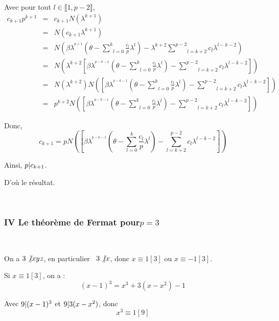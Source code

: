 Avec pour tout $l \in \llbracket 1, p - 2 \rrbracket$,
\begin{eqnarray*}
  c_{k + 1} p^{k + 1} & = & c_{k + 1} N (\lambda^{k + 1})\\
  & = & N (c_{k + 1} \lambda^{k + 1})\\
  & = & N \left( \beta \lambda^{^{p + 1}} \left( \theta - \underset{l =
  0}{\overset{k}{\sum}} \frac{c_l}{p} \lambda^l \right) - \lambda^{k + 2}
  \underset{l = k + 2}{\overset{p - 2}{\sum}} c_l \lambda^{l - k - 2}
  \right)\\
  & = & N \left( \lambda^{k + 2} \left[ \beta \lambda^{^{p - k - 1}} \left(
  \theta - \underset{l = 0}{\overset{k}{\sum}} \frac{c_l}{p} \lambda^l \right)
  - \underset{l = k + 2}{\overset{p - 2}{\sum}} c_l \lambda^{l - k - 2}
  \right] \right)\\
  & = & N (\lambda^{k + 2}) N \left( \left[ \beta \lambda^{^{p - k - 1}}
  \left( \theta - \underset{l = 0}{\overset{k}{\sum}} \frac{c_l}{p} \lambda^l
  \right) - \underset{l = k + 2}{\overset{p - 2}{\sum}} c_l \lambda^{l - k -
  2} \right] \right)\\
  & = & p^{k + 2} N \left( \left[ \beta \lambda^{^{p - k - 1}} \left( \theta
  - \underset{l = 0}{\overset{k}{\sum}} \frac{c_l}{p} \lambda^l \right) -
  \underset{l = k + 2}{\overset{p - 2}{\sum}} c_l \lambda^{l - k - 2} \right]
  \right)
\end{eqnarray*}


Donc,
\[ c_{k + 1} = p  N \left( \left[ \beta \lambda^{^{p - k - 1}} \left( \theta -
   \underset{l = 0}{\overset{k}{\sum}} \frac{c_l}{p} \lambda^l \right) -
   \underset{l = k + 2}{\overset{p - 2}{\sum}} c_l \lambda^{l - k - 2} \right]
   \right) \]


Ainsi, $p | c_{k + 1} $.

D'o{\`u} le r{\'e}sultat.

\

\subsubsection*{IV Le th{\'e}or{\`e}me de Fermat pour$p = 3$}

\

 On a $3 \not{| } x y z$, en particulier \ $3 \not{|
} x$, donc $x \equiv 1 [3]$ ou $x \equiv - 1 [3]$.

Si $x \equiv 1 [3]$, on a :
\[ (x - 1)^3 = x^3 + 3 (x - x^2) - 1 \]


Avec $9 | (x - 1)^3 $ et $9 | 3 (x - x^2) $, donc
\[ x^3 \equiv 1 [9] \]


